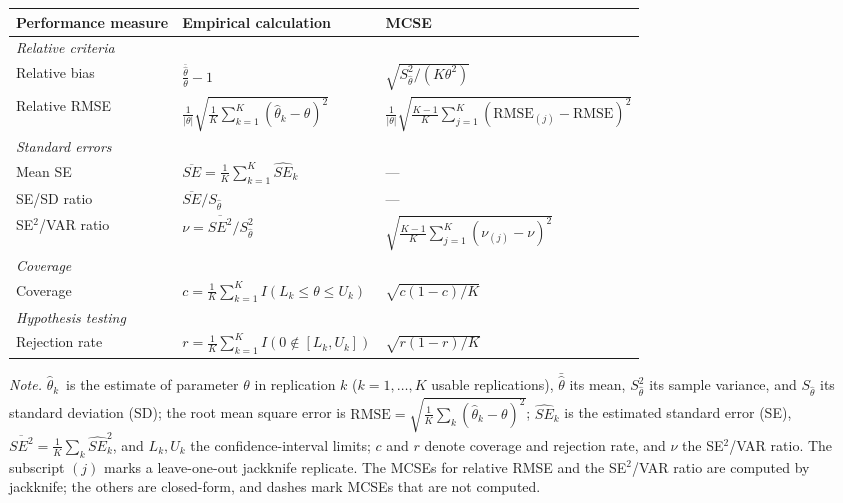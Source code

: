 \documentclass[
  man,
  longtable,
  nolmodern,
  notxfonts,
  notimes,
  colorlinks=true,linkcolor=blue,citecolor=blue,urlcolor=blue]{apa7}
\begin{document}
\begin{table}

{\caption{{Subset of the Performance Measures for Evaluating Parameter
Estimates}{\label{tbl-performance}}}
\vspace{-20pt}}

\begin{center}

\begin{longtable*}{lll}
\toprule
Performance measure & Empirical calculation & MCSE\\
\midrule
\textit{Relative criteria} &  & \\
Relative bias & $\tfrac{\bar{\hat\theta}}{\theta}-1$ & $\sqrt{S_{\hat\theta}^2/(K\theta^2)}$\\
Relative RMSE & $\tfrac{1}{|\theta|}\sqrt{\tfrac{1}{K}\sum_{k=1}^{K}(\hat\theta_k-\theta)^2}$ & $\tfrac{1}{|\theta|}\sqrt{\tfrac{K-1}{K}\sum_{j=1}^{K}(\mathrm{RMSE}_{(j)}-\mathrm{RMSE})^2}$\\
\textit{Standard errors} &  & \\
Mean SE & $\overline{SE}=\tfrac{1}{K}\sum_{k=1}^{K}\widehat{SE}_k$ & ---\\
SE/SD ratio & $\overline{SE}/S_{\hat\theta}$ & ---\\
SE$^2$/VAR ratio & $\nu=\overline{SE^2}/S_{\hat\theta}^2$ & $\sqrt{\tfrac{K-1}{K}\sum_{j=1}^{K}(\nu_{(j)}-\nu)^2}$\\
\textit{Coverage} &  & \\
Coverage & $c=\tfrac{1}{K}\sum_{k=1}^{K}I(L_k\le\theta\le U_k)$ & $\sqrt{c(1-c)/K}$\\
\textit{Hypothesis testing} &  & \\
Rejection rate & $r=\tfrac{1}{K}\sum_{k=1}^{K}I(0\notin[L_k,U_k])$ & $\sqrt{r(1-r)/K}$\\
\bottomrule
\end{longtable*}
\end{center}

\vspace{-20pt}
\noindent \emph{Note.} \(\hat\theta_k\)~is the estimate of parameter
\(\theta\) in replication \(k\) (\(k = 1, \dots, K\) usable
replications), \(\bar{\hat\theta}\) its mean, \(S_{\hat\theta}^2\) its
sample variance, and \(S_{\hat\theta}\) its standard deviation (SD); the
root mean square error is
\(\mathrm{RMSE} = \sqrt{\tfrac{1}{K}\sum_k (\hat\theta_k-\theta)^2}\);
\(\widehat{SE}_k\) is the estimated standard error (SE),
\(\overline{SE^2} = \tfrac{1}{K}\sum_k \widehat{SE}_k^2\), and
\(L_k, U_k\) the confidence-interval limits; \(c\) and \(r\) denote
coverage and rejection rate, and \(\nu\) the SE\(^2\)/VAR ratio. The
subscript \((j)\) marks a leave-one-out jackknife replicate. The MCSEs
for relative RMSE and the SE\(^2\)/VAR ratio are computed by jackknife;
the others are closed-form, and dashes mark MCSEs that are not computed.

\end{table}
\end{document}
